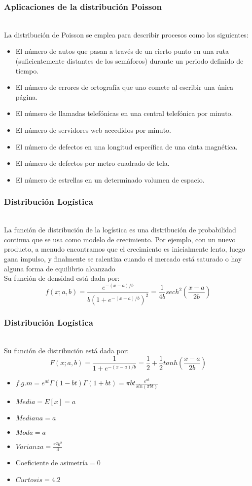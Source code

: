 \documentclass[11pt]{beamer}
\begin{document}
\begin{frame}
\frametitle{Aplicaciones de la distribución Poisson}
~\\La distribución de Poisson se emplea para describir procesos como los siguientes:  
\begin{itemize}
\item El n\'{u}mero de autos que pasan a través de un cierto punto en una ruta (suficientemente
distantes de los semáforos) durante un periodo definido de tiempo.  
\item El n\'{u}mero de errores de ortografía que uno comete al escribir una única página.  
\item El n\'{u}mero de llamadas telefónicas en una central telefónica por minuto.  
\item El n\'{u}mero de servidores web accedidos por minuto.  
\item El n\'{u}mero de defectos en una longitud específica de una cinta magnética.   
\item El n\'{u}mero de defectos por metro cuadrado de tela.
\item El n\'{u}mero de estrellas en un determinado volumen de espacio.
\end{itemize}
\end{frame}
\begin{frame}
\frametitle{Distribución Logística}
~\\La función de distribución de la logística es una distribución de probabilidad continua que se usa como modelo de crecimiento. Por ejemplo,
con un nuevo producto, a menudo encontramos que el crecimiento es inicialmente lento, luego gana impulso,
y finalmente se ralentiza cuando el mercado está saturado o hay alguna forma de equilibrio
alcanzado
~\\ Su función de densidad está dada por:
$$f(x;a,b)=\frac{e^{-(x-a)/b}}{b(1+e^{-(x-a)/b})^2}=\frac{1}{4b}sech^2\left(\frac{x-a}{2b}\right)$$
\end{frame}

\begin{frame}
\frametitle{Distribución Logística}
~\\ Su función de distribución está dada por:
$$F(x;a,b)=\frac{1}{1+e^{-(x-a)/b}}=\frac{1}{2}+\frac{1}{2}tanh\left(\frac{x-a}{2b}\right)$$
\begin{itemize}
\item $f.g.m=e^{at}\Gamma(1-bt)\Gamma(1+bt)=\pi bt\frac{e^{at}}{sin(\pi bt)}$
\item $Media=E[x]=a$
\item $Mediana=a$
\item $Moda=a$
\item $Varianza=\frac{\pi^2 b^2}{3}$
\item Coeficiente de asimetría$=0$
\item $Curtosis=4.2$
\end{itemize}
\end{frame}
\end{document}
